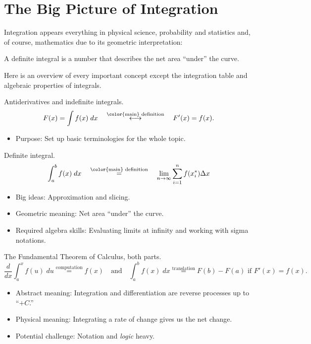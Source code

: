 \documentclass[../main.tex]{subfiles}
\begin{document}
 \section{The Big Picture of Integration}
  Integration appears everything in physical science, probability and statistics and, of course, mathematics due to its geometric interpretation:

  \medskip
  \begin{mdframed}[style=simple]
    \centering
    \color{main}
    A definite integral is a number that describes the net area ``under'' the curve.
  \end{mdframed}

  Here is an overview of every important concept except the integration table and algebraic properties of integrals.
  \begin{description}[itemsep=2ex]
    \item[Terminologies.] Antiderivatives and indefinite integrals.
      \[
        F(x) = \int f(x) \;dx \quad\overset{\text{\color{main} definition}}{\longleftrightarrow}\quad F'(x) = f(x).
      \]        
      \begin{itemize}
        \item Purpose: Set up basic terminologies for the whole topic.
      \end{itemize}

    \item[Concept.] Definite integral.
      \[
        \int_{a}^{b} f(x) \; dx \quad\overset{\text{\color{main} definition}}{=}\quad \lim_{n \to \infty} \sum_{i=1}^{n} f(x_{i}^{*}) {\Delta x}
      \]

      \begin{itemize}
        \item Big ideas: Approximation and slicing.
        \item Geometric meaning: Net area ``under'' the curve.
        \item Required algebra skills: Evaluating limits at infinity and working with sigma notations.
      \end{itemize}

    \item[Theorem.] The Fundamental Theorem of Calculus, both parts. 
      \[
        \frac{d}{dx} \int_{a}^{x} f(u) \;du \overset{\text{computation}}{=} f(x) \quad\text{and}\quad \int_{a}^{b} f(x) \;dx \overset{\text{translation}}{=} F(b) - F(a) \text{ if } F'(x) = f(x).
      \]
      \begin{itemize}
        \item Abstract meaning: Integration and differentiation are reverse processes up to ``\(+C\).''
        \item Physical meaning: Integrating a rate of change gives us the net change.
        \item Potential challenge: Notation and \emph{logic} heavy.
      \end{itemize}


\end{description}
\end{document}
